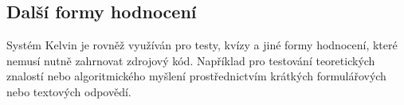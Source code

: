 \subsection{Další formy hodnocení}
\label{subsec:kelvin-other-assessments}

Systém Kelvin je rovněž využíván pro testy, kvízy a jiné formy hodnocení, které nemusí nutně zahrnovat zdrojový kód.
Například pro testování teoretických znalostí nebo algoritmického myšlení prostřednictvím krátkých formulářových nebo textových odpovědí.

\endinput
